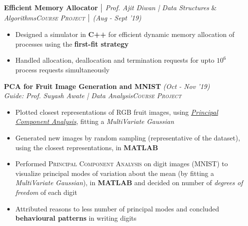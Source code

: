 \documentclass{article}
\begin{document}
\vspace{-5pt}
\textbf{Efficient Memory Allocator} $\bigm|$ {\it Prof. Ajit Diwan | Data Structures} \& {\it Algorithms}\hfill{\sl \small \textsc{Course Project} $\bigm|$ (Aug - Sept '19)}\\
\vspace{-19pt}
\begin{itemize}[itemsep = -1 mm, leftmargin=*]
  \item Designed a simulator in \textbf{C++} for efficient dynamic memory allocation of processes using the \textbf{first-fit strategy}
   \item Handled allocation, deallocation and termination requests for upto $10^{\text{6}}$ process requests simultaneously
\end{itemize}
\vspace{-5pt}
\textbf{PCA for Fruit Image Generation and MNIST} \hfill{\sl \small (Oct - Nov '19)}\\{\it Guide: Prof. Suyash Awate | Data Analysis}\hfill{\sl \small \textsc{Course Project}}\\
\vspace{-19pt}
\begin{itemize}[itemsep = -1 mm, leftmargin=*]
   \item Plotted closest representations of RGB fruit images, using \underline{\textit{Principal Component Analysis}}, fitting a \textit{MultiVariate Gaussian}
    \item Generated new images by random sampling (representative of the dataset), using the closest representations, in \textbf{MATLAB}
    \item Performed \textsc{Principal Component Analysis} on digit images (MNIST) to visualize principal modes of variation about the mean (by fitting a \textit {MultiVariate Gaussian}), in \textbf{MATLAB} and decided on number of \textit{degrees of freedom} of each digit
    \item Attributed reasons to less number of principal modes and concluded \textbf{behavioural patterns} in writing digits
\end{itemize}
\end{document}

